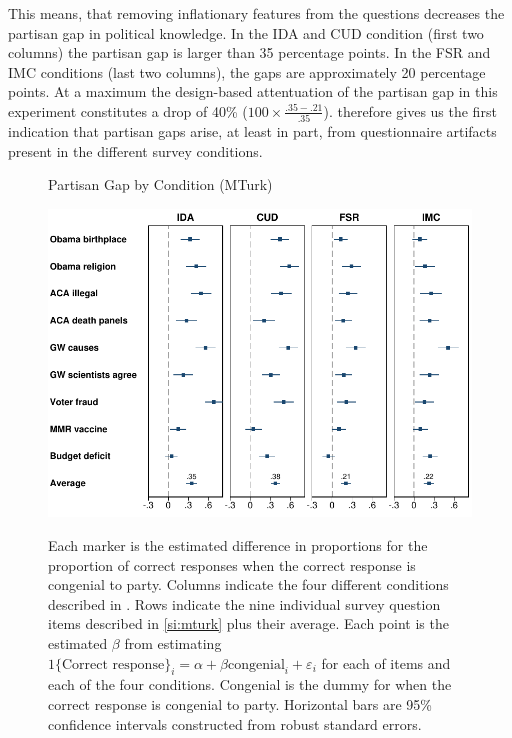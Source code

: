 \documentclass[12pt, letterpaper]{article}
\begin{document}
This means, that removing inflationary features from the questions decreases the partisan gap in political knowledge.
In the IDA and CUD condition (first two columns) the partisan gap is larger than 35 percentage points. In the FSR and IMC conditions (last two columns), the gaps are approximately 20 percentage points. At a maximum the design-based attentuation of the partisan gap in this experiment constitutes a drop of 40\% ($100 \times \frac{.35-.21}{.35}$).  therefore gives us the first indication that partisan gaps arise, at least in part, from questionnaire artifacts present in the different survey conditions.


%

\begin{center}
	\begin{figure}[t]
		\centering
		\caption{Partisan Gap by Condition (MTurk)}
		\includegraphics[width=\textwidth]{../figs/partisan-gap-by-item-arm.pdf}
		\label{fig:partisangaps-mturk}
		\caption*{\footnotesize 
			Each marker is the estimated difference in proportions for the proportion of correct responses when the correct response is congenial to party.
			Columns indicate the four different conditions described in . Rows indicate the nine individual survey question items described in \cref{si:mturk} plus their average.
			Each point is the estimated $\beta$ from estimating $1\{\text{Correct response}\}_i = \alpha + \beta \text{congenial}_i + \varepsilon_i$ for each of items and each of the four conditions.	Congenial is the dummy for when the correct response is congenial to party.
			Horizontal bars are 95\% confidence intervals constructed from robust standard errors.
		}
	\end{figure}
\end{center}
\end{document}
